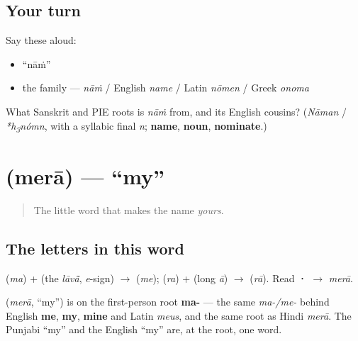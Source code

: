 \subsection*{Your turn}
Say these aloud:

\begin{itemize}
\raggedright
  \item \textquotedblleft{}nāṁ\textquotedblright{}
  \item the family — \emph{nāṁ} / English \emph{name} / Latin \emph{nōmen} / Greek \emph{onoma}
\end{itemize}

\begin{tcolorbox}[breakable,colback=teal!4,colframe=teal!35!black,title={Before you move on}]
What Sanskrit and PIE roots is \emph{nāṁ} from, and its English cousins? (\emph{Nāman} / \emph{*h\textsubscript{3}nómn}, with a syllabic final \emph{n}; \textbf{name}, \textbf{noun}, \textbf{nominate}.)
\end{tcolorbox}
\section[\texorpdfstring{\pa{ਮੇਰਾ} (merā)}{ਮੇਰਾ (merā)}]{ (merā) — \textquotedblleft{}my\textquotedblright{}}

\label{lesson:PA-C02-mera}



\begin{quote}
The little word that makes the name \emph{yours}.
\end{quote}

\subsection*{The letters in this word}
\textbf{} (\emph{ma}) + \textbf{} (the \emph{lāvā̃}, \emph{e}-sign) $\to$ \textbf{} (\emph{me}); \textbf{} (\emph{ra}) + \textbf{} (long \emph{ā}) $\to$ \textbf{} (\emph{rā}). Read \textbf{·} $\to$ \emph{merā}.

\begin{cousinweb}
\textbf{} (\emph{merā}, \textquotedblleft{}my\textquotedblright{}) is on the first-person root \textbf{ma-} — the same \emph{ma-/me-} behind English \textbf{me}, \textbf{my}, \textbf{mine} and Latin \emph{meus}, and the same root as Hindi \emph{merā}. The Punjabi \textquotedblleft{}my\textquotedblright{} and the English \textquotedblleft{}my\textquotedblright{} are, at the root, one word.
\end{cousinweb}

